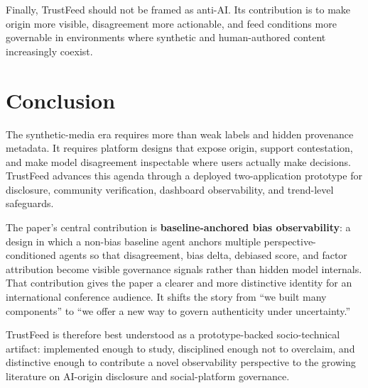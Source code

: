 \documentclass[acmlarge,screen,nonacm]{acmart}
\begin{document}
Finally, TrustFeed should not be framed as anti-AI. Its contribution is to make origin more visible, disagreement more actionable, and feed conditions more governable in environments where synthetic and human-authored content increasingly coexist.

\section{Conclusion}

The synthetic-media era requires more than weak labels and hidden provenance metadata. It requires platform designs that expose origin, support contestation, and make model disagreement inspectable where users actually make decisions. TrustFeed advances this agenda through a deployed two-application prototype for disclosure, community verification, dashboard observability, and trend-level safeguards.

The paper's central contribution is \textbf{baseline-anchored bias observability}: a design in which a non-bias baseline agent anchors multiple perspective-conditioned agents so that disagreement, bias delta, debiased score, and factor attribution become visible governance signals rather than hidden model internals. That contribution gives the paper a clearer and more distinctive identity for an international conference audience. It shifts the story from ``we built many components'' to ``we offer a new way to govern authenticity under uncertainty.''

TrustFeed is therefore best understood as a prototype-backed socio-technical artifact: implemented enough to study, disciplined enough not to overclaim, and distinctive enough to contribute a novel observability perspective to the growing literature on AI-origin disclosure and social-platform governance.
\end{document}
